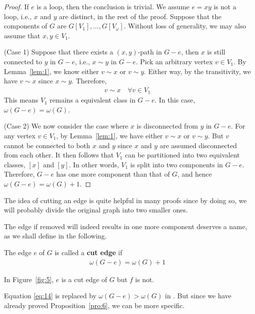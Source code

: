 \documentclass[thmcnt=section, 12pt, color=cyan]{my-elegantbook}
\begin{document}
\begin{proof}
	If $e$ is a loop, then the conclusion is trivial. 
	We assume $e = xy$ is not a loop, i.e., 
	$x$ and  $y$ are distinct,
	in the rest of the proof. 
	Suppose that the components of $G$
	are  $G[V_1], \ldots, G[V_\omega]$.
	Without loss of generality, 
	we may also assume that $x, y \in V_1$.

	(Case 1) Suppose that there exists a $(x,y)$-path in $G-e$,
	then $x$ is still connected to $y$ in $G-e$,
	i.e., $x \sim y$ in $G-e$.
	Pick an arbitrary vertex $v \in V_1$.
	By Lemma~\ref{lem:1}, 
	we know either $v \sim x$ or $v \sim y$.
	Either way, by the transitivity, we have $v \sim x$
	since $x \sim y$. 
	Therefore, 
	\begin{align*}
		v \sim x 
		\quad \forall v \in V_1
	\end{align*}
	This means $V_1$ remains a equivalent class in $G-e$.
	In this case, $\omega(G-e) = \omega(G)$.

	(Case 2) We now consider the case where 
	$x$ is disconnected from $y$ in $G-e$.
	For any vertex $v \in V_1$,
	by Lemma~\ref{lem:1},
	we have either $v \sim x$ or $v \sim y$. 
	But $v$ cannot be connected to both $x$ and $y$
	since $x$ and $y$ are 
	assumed disconnected from each other.
	It then follows that $V_1$ can be partitioned into
	two equivalent classes, $[x]$ and $[y]$. 
	In other words, $V_1$ is split into two components in $G-e$.
	Therefore, $G-e$ has one more component than that of $G$, 
	and hence $\omega(G-e) = \omega(G) + 1$.
\end{proof}

The idea of cutting an edge 
is quite helpful in many proofs
since by doing so, 
we will probably divide the original graph 
into two smaller ones.

The edge if removed will indeed results in 
one more component deserves a name, 
as we shall define in the following.

\begin{definition} \label{def:1}
	The edge $e$ of $G$ is 
	called a \textbf{cut edge} if 
	\begin{align}
		\omega(G-e) = \omega(G) + 1
		\label{eq:14}
	\end{align}
\end{definition}

In Figure~\ref{fig:5}, $e$ is a cut edge of $G$ but $f$ is not.

\begin{note}
	Equation \eqref{eq:14}
	is replaced by 
	$\omega(G-e) > \omega(G)$ in
	\parencite{bondyGraphTheoryApplications1976}.
	But since we have already proved Proposition~\ref{pro:6}, 
	we can be more specific.
\end{note}
\end{document}
